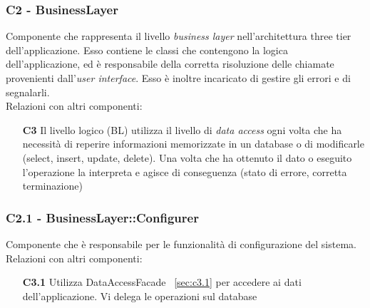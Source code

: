 \subsubsection{C2 - BusinessLayer} \label{sec:c2}
Componente che rappresenta il livello \textit{business layer} nell'architettura three tier dell'applicazione. Esso contiene le classi che contengono la logica dell'applicazione, ed è responsabile della corretta risoluzione delle chiamate provenienti dall'\textit{user interface}. Esso è inoltre incaricato di gestire gli errori e di segnalarli.
\\
Relazioni con altri componenti: 
\begin{itemize} 
\item [\textbf{C3}]
Il livello logico (BL) utilizza il livello di \textit{data access} ogni volta che ha necessità di reperire informazioni memorizzate in un database o di modificarle (select, insert, update, delete). Una volta che ha ottenuto il dato o eseguito l'operazione la interpreta e agisce di conseguenza (stato di errore, corretta terminazione) 
\end{itemize} 

\subsubsection{C2.1 - BusinessLayer::Configurer} \label{sec:c2.1}
Componente che è responsabile per le funzionalità di configurazione del sistema.\\
Relazioni con altri componenti: 
\begin{itemize} 
\item [\textbf{C3.1}]
Utilizza DataAccessFacade ~\ref{sec:c3.1} per accedere ai dati dell'applicazione. Vi delega le operazioni sul database 
\end{itemize} 

